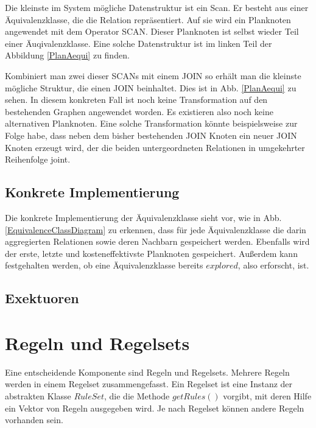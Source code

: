 Die kleinste im System mögliche Datenstruktur ist ein Scan. Er besteht aus einer Äquivalenzklasse, die die Relation repräsentiert. Auf sie wird ein Planknoten angewendet mit dem Operator SCAN. Dieser Planknoten ist selbst wieder Teil einer Äuqivalenzklasse. Eine solche Datenstruktur ist im linken Teil der Abbildung \ref{PlanAequi} zu finden.

Kombiniert man zwei dieser SCANs mit einem JOIN so erhält man die kleinste mögliche Struktur, die einen JOIN beinhaltet. Dies ist in Abb. \ref{PlanAequi} zu sehen. In diesem konkreten Fall ist noch keine Transformation auf den bestehenden Graphen angewendet worden. Es existieren also noch keine alternativen Planknoten. Eine solche Transformation könnte beispielsweise zur Folge habe, dass neben dem bisher bestehenden JOIN Knoten ein neuer JOIN Knoten erzeugt wird, der die beiden untergeordneten Relationen in umgekehrter Reihenfolge joint.


\subsection{Konkrete Implementierung}

Die konkrete Implementierung der Äquivalenzklasse sieht vor, wie in Abb. \ref{EquivalenceClassDiagram} zu erkennen, dass für jede Äquivalenzklasse die darin aggregierten Relationen sowie deren Nachbarn gespeichert werden. Ebenfalls wird der erste, letzte und kosteneffektivste Planknoten gespeichert. Außerdem kann festgehalten werden, ob eine Äquivalenzklasse bereits $explored$, also erforscht, ist. 






\subsection{Exektuoren}










\section{Regeln und Regelsets}


Eine entscheidende Komponente sind Regeln und Regelsets. Mehrere Regeln werden in einem Regelset zusammengefasst. Ein Regelset ist eine Instanz der abstrakten Klasse $RuleSet$, die die Methode $getRules()$ vorgibt, mit deren Hilfe ein Vektor von Regeln ausgegeben wird. Je nach Regelset können andere Regeln vorhanden sein.







